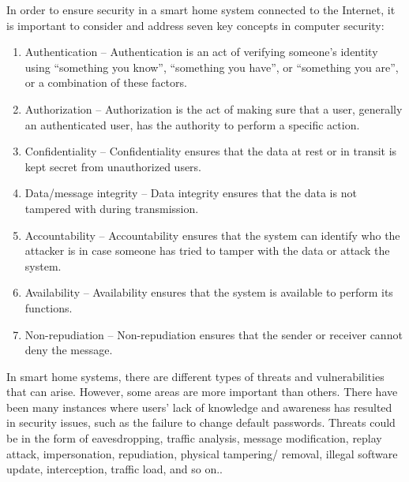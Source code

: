 In order to ensure security in a smart home system connected to the Internet, it is important to consider and address seven key concepts in computer security:
\begin{enumerate}
    \item Authentication – Authentication is an act of verifying someone’s identity using “something you know”, “something you have”, or “something you are”, or a combination of these factors.
\item Authorization – Authorization is the act of making sure that a user, generally an authenticated user, has the authority to perform a specific action.
\item Confidentiality – Confidentiality ensures that the data at rest or in transit is kept secret from unauthorized users.
\item Data/message integrity – Data integrity ensures that the data is not tampered with during transmission.
\item Accountability – Accountability ensures that the system can identify who the attacker is in case someone has tried to tamper with the data or attack the system.
\item Availability – Availability ensures that the system is available to perform its functions.
\item Non-repudiation – Non-repudiation ensures that the sender or receiver cannot deny the message.
\end{enumerate}

In smart home systems, there are different types of threats and vulnerabilities that can arise. However, some areas are more important than others. There have been many instances where users' lack of knowledge and awareness has resulted in security issues, such as the failure to change default passwords.
Threats could be in the form of eavesdropping, traffic analysis, message modification, replay attack, impersonation, repudiation, physical tampering/ removal, illegal software update, interception, traffic load, and so on..

